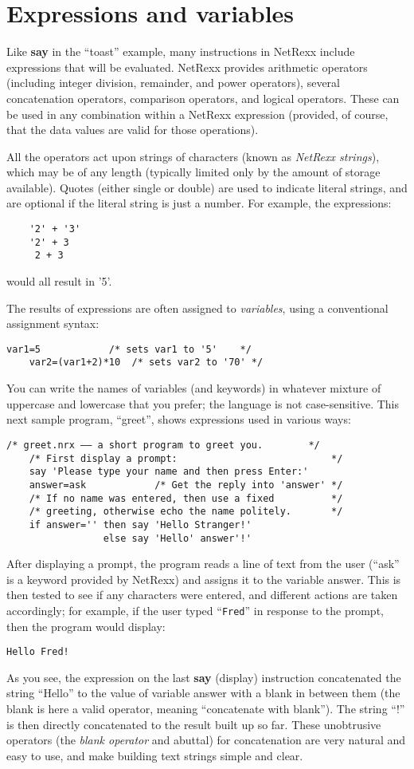 \section{Expressions and variables}
Like \textbf{say} in the “toast” example, many instructions in NetRexx include expressions that will be evaluated. NetRexx provides arithmetic operators (including integer division, remainder, and power operators), several concatenation operators, comparison operators, and logical operators. These can be used in any combination within a NetRexx expression (provided, of course, that the data values are valid for those operations).

All the operators act upon strings of characters (known as \emph{NetRexx
strings}), which may be of any length (typically limited only by the
amount of storage available). Quotes (either single or double) are
used to indicate literal strings, and are optional if the literal
string is just a number. For example, the expressions:
\begin{verbatim}
    '2' + '3'
    '2' + 3
     2 + 3
\end{verbatim}
would all result in '5'.

The results of expressions are often assigned to \emph{variables}, using a
conventional assignment syntax:
\begin{lstlisting}[label=assignment,caption=Assignment]
    var1=5            /* sets var1 to '5'    */
    var2=(var1+2)*10  /* sets var2 to '70' */
\end{lstlisting}
You can write the names of variables (and keywords) in whatever mixture of uppercase and lowercase that you prefer; the language is not case-sensitive.
This next sample program, “greet”, shows expressions used in various
ways:
\begin{lstlisting}[label=greet,caption=Greet]
    /* greet.nrx –– a short program to greet you.        */
    /* First display a prompt:                           */
    say 'Please type your name and then press Enter:'
    answer=ask            /* Get the reply into 'answer' */
    /* If no name was entered, then use a fixed          */
    /* greeting, otherwise echo the name politely.       */
    if answer='' then say 'Hello Stranger!'
                 else say 'Hello' answer'!'
\end{lstlisting}
After displaying a prompt, the program reads a line of text from the
user (“ask” is a keyword provided by NetRexx) and assigns it to the
variable answer. This is then tested to see if any characters were
entered, and different actions are taken accordingly; for example, if
the user typed “\texttt{Fred}” in response to the prompt, then the program
would display:
\begin{verbatim}
Hello Fred!
\end{verbatim}
As you see, the expression on the last \textbf{say} (display) instruction
concatenated the string “Hello” to the value of variable answer with a
blank in between them (the blank is here a valid operator, meaning
“concatenate with blank”). The string “!” is then directly
concatenated to the result built up so far. These unobtrusive
operators (the \emph{blank operator} and abuttal) for concatenation are very
natural and easy to use, and make building text strings simple and
clear.


